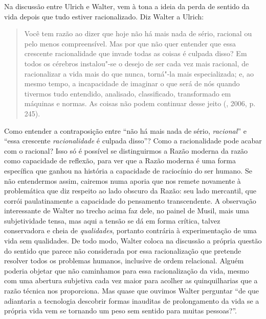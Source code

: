 Na discussão entre Ulrich e Walter, vem à tona a ideia da perda de
sentido da vida depois que tudo estiver racionalizado. Diz Walter a
Ulrich:

\begin{quote}
Você tem razão ao dizer que hoje não há mais nada de sério, racional ou
pelo menos compreensível. Mas por que não quer entender que essa
crescente racionalidade que invade todas as coisas é culpada disso? Em
todos os cérebros instalou"-se o desejo de ser cada vez mais racional, de
racionalizar a vida mais do que nunca, torná"-la mais especializada; e,
ao mesmo tempo, a incapacidade de imaginar o que será de nós quando
tivermos tudo entendido, analisado, classificado, transformado em
máquinas e normas. As coisas não podem continuar desse jeito (, 2006, p. 245).
\end{quote}

Como entender a contraposição entre ``não há mais nada de sério,
\emph{racional}'' e ``essa crescente \emph{racionalidade} é culpada
disso''? Como a racionalidade pode acabar com o racional? Isso só é
possível se distinguirmos a Razão moderna da razão como capacidade de
reflexão, para ver que a Razão moderna é uma forma específica que ganhou
na história a capacidade de raciocínio do ser humano. Se não entendermos
assim, cairemos numa aporia que nos remete novamente à problemática que
diz respeito ao lado obscuro da Razão: seu lado mercantil, que corrói
paulatinamente a capacidade do pensamento transcendente. A observação
interessante de Walter no trecho acima faz dele, no painel de Musil,
mais uma subjetividade tensa, mas aqui a tensão se dá em forma crítica,
talvez conservadora e cheia de \emph{qualidades}, portanto contrária à
experimentação de uma vida sem qualidades. De todo modo, Walter coloca
na discussão a própria questão do sentido que parece não considerada por
essa racionalização que pretende resolver todos os problemas humanos,
inclusive de ordem relacional. Alguém poderia objetar que não caminhamos
para essa racionalização da vida, mesmo com uma abertura subjetiva cada
vez maior para acolher as quinquilharias que a razão técnica nos
proporciona. Mas quase que ouvimos Walter perguntar ``de que adiantaria
a tecnologia descobrir formas inauditas de prolongamento da vida se a
própria vida vem se tornando um peso sem sentido para muitas pessoas?''.

